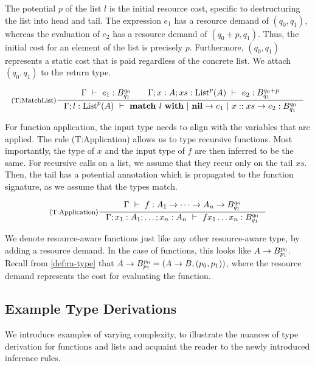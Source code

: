 The potential \(p\) of the list \(l\) is the initial resource cost, specific to destructuring the list into head and tail. The expression \(e_1\) has a resource demand of \((q_0, q_1)\), whereas the evaluation of \(e_2\) has a resource demand of \((q_0 + p, q_1)\). Thus, the initial cost for an element of the list is precisely \(p\). Furthermore, \((q_0, q_1)\) represents a static cost that is paid regardless of the concrete list. We attach \((q_0, q_1)\) to the return type.

\[
   \inference[(T:MatchList)]
   {\typing{\Gamma}{e_1}{\ratype{B}{q_0}{q_1}} \qquad \typing{\Gamma;x : A; xs : \ralist{p}{A}}{e_2}{\ratype{B}{q_0 + p}{q_1}}}
   {\typing{\Gamma;l : \ralist{p}{A}}{\listmatch{l}{e_1}{e_2}}{\ratype{B}{q_0}{q_1}}}
\]

For function application, the input type needs to align with the variables that are applied. The rule (T:Application) allows us to type recursive functions. Most importantly, the type of \(x\) and the input type of \(f\) are then inferred to be the same. For recursive calls on a list, we assume that they recur only on the tail \(xs\). Then, the tail has a potential annotation which is propagated to the function signature, as we assume that the types match.

\[
   \inference[(T:Application)]
   {\typing{\Gamma}{f}{A_1 \to \dots \to A_n \to \ratype{B}{q_0}{q_1}}}
   {\typing{\Gamma;x_1:A_1;\dots;x_n:A_n}{f x_1 \dots x_n}{\ratype{B}{q_0}{q_1}}}
\]

\begin{remark}
   We denote resource-aware functions just like any other resource-aware type, by adding a resource demand. In the case of functions, this looks like \(A \to B ^{p_0}_{p_1}\). Recall from \cref{def:ra-type} that \(A \to B ^{p_0}_{p_1} = (A \to B, (p_0, p_1))\), where the resource demand represents the cost for evaluating the function.
\end{remark}

\subsection{Example Type Derivations}\label{sec:example-type-derivations}

We introduce examples of varying complexity, to illustrate the nuances of type derivation for functions and lists and acquaint the reader to the newly introduced inference rules.

